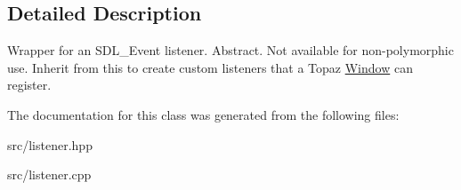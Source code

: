 \subsection{Detailed Description}
Wrapper for an S\+D\+L\+\_\+\+Event listener. Abstract. Not available for non-\/polymorphic use. Inherit from this to create custom listeners that a Topaz \mbox{\hyperlink{class_window}{Window}} can register. 

The documentation for this class was generated from the following files\+:\begin{DoxyCompactItemize}
\item 
src/listener.\+hpp\item 
src/listener.\+cpp\end{DoxyCompactItemize}
